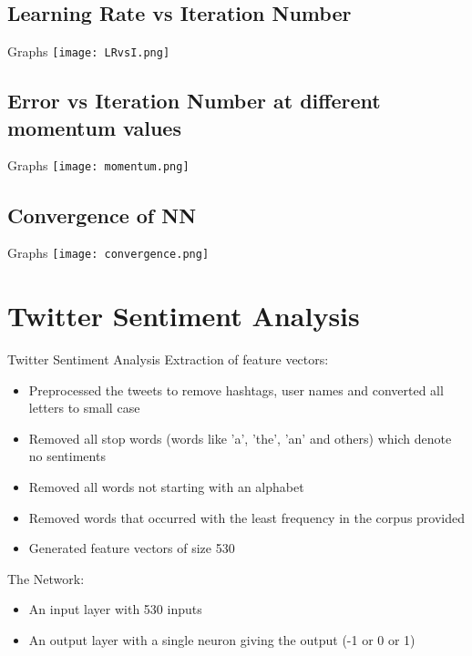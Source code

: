 \documentclass{beamer}
\begin{document}
\subsection{Learning Rate vs Iteration Number}
\begin{frame}[fragile]{Graphs}
	\texttt{[image: LRvsI.png]}
\end{frame}

\subsection{Error vs Iteration Number at different momentum values}
\begin{frame}[fragile]{Graphs}
	\texttt{[image: momentum.png]}
\end{frame}


\subsection{Convergence of NN}
\begin{frame}[fragile]{Graphs}
	\texttt{[image: convergence.png]}
\end{frame}

\section{Twitter Sentiment Analysis}
\begin{frame}{Twitter Sentiment Analysis}
Extraction of feature vectors:
\begin{itemize}
	\item Preprocessed the tweets to remove hashtags, user names and converted all letters to small case
    \item Removed all stop words (words like 'a', 'the', 'an' and others) which denote no sentiments
    \item Removed all words not starting with an alphabet
    \item Removed words that occurred with the least frequency in the corpus provided
    \item Generated feature vectors of size 530
    \newline
\end{itemize}

The Network:
\begin{itemize}
	\item An input layer with 530 inputs
    \item An output layer with a single neuron giving the output (-1 or 0 or 1)
        
\end{itemize}
\end{frame}
\end{document}
